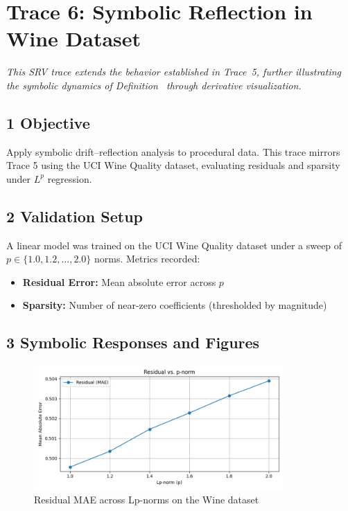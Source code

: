 \section*{Trace 6: Symbolic Reflection in Wine Dataset}
\label{section:trace6_symbolic_reflection_wine}

\textit{This SRV trace extends the behavior established in Trace~5, further illustrating the symbolic dynamics of Definition~ through derivative visualization.}

\subsection*{1 Objective}
\label{subsection:trace6_objective}

Apply symbolic drift–reflection analysis to procedural data. This trace mirrors Trace 5 using the UCI Wine Quality dataset, evaluating residuals and sparsity under $L^p$ regression.

\subsection*{2 Validation Setup}
\label{subsection:trace6_validation_setup}

A linear model was trained on the UCI Wine Quality dataset under a sweep of $p \in \{1.0, 1.2, \ldots, 2.0\}$ norms. Metrics recorded:
\begin{itemize}
    \item \textbf{Residual Error:} Mean absolute error across $p$
    \item \textbf{Sparsity:} Number of near-zero coefficients (thresholded by magnitude)
\end{itemize}

\subsection*{3 Symbolic Responses and Figures}
\label{subsection:trace6_symbolic_responses_figures}

\begin{figure}[H]
\centering
\includegraphics[width=0.85\textwidth]{srv_traces/6_residual_vs_p.png}
\caption{Residual MAE across Lp-norms on the Wine dataset}
\label{figure:trace6_residual_mae_wine}
\end{figure}

